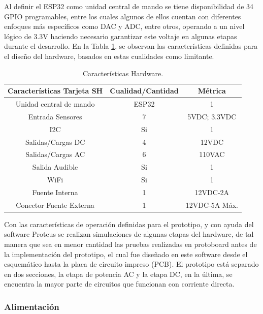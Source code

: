 Al definir el ESP32 como unidad central de mando se tiene disponibilidad de 34 GPIO programables, entre los cuales algunos de ellos cuentan con diferentes enfoques más específicos como DAC y ADC, entre otros, operando a un nivel lógico de 3.3V haciendo necesario garantizar este voltaje en algunas etapas durante el desarrollo. En la Tabla \ref{table:carac}, se observan las características definidas para el diseño del hardware, basados en estas cualidades como limitante.\\

\begin{table}
	\begin{center}
		\caption{Características Hardware.}
		\label{table:carac}
		\begin{tabular}{|c|c|c|}
			\hline 
			\textbf{Características Tarjeta SH} & \textbf{Cualidad/Cantidad} & \textbf{Métrica} \\ 
			\hline 
			Unidad central de mando & ESP32 & 1\\ 
			\hline 
			Entrada Sensores & 7 & 5VDC; 3.3VDC\\
			\hline 
			I2C & Si & 1\\
			\hline 
			Salidas/Cargas DC & 4 & 12VDC\\
			\hline 
			Salidas/Cargas AC & 6 & 110VAC\\
			\hline 
			Salida Audible & Si & 1\\
			\hline 
			WiFi & Si & 1\\ 
			\hline 
			Fuente Interna & 1 & 12VDC-2A\\
			\hline
			Conector Fuente Externa & 1 & 12VDC-5A Máx.\\
			\hline
		\end{tabular} 
	\end{center}
\end{table}

Con las características de operación definidas para el prototipo, y con ayuda del software Proteus se realizan simulaciones de algunas etapas del hardware, de tal manera que sea en menor cantidad las pruebas realizadas en protoboard antes de la implementación del prototipo, el cual fue diseñado en este software desde el esquemático hasta la placa de circuito impreso (PCB). El prototipo está separado en dos secciones, la etapa de potencia AC y la etapa DC, en la última, se encuentra la mayor parte de circuitos que funcionan con corriente directa.\\

	\subsubsection{Alimentación}
	
